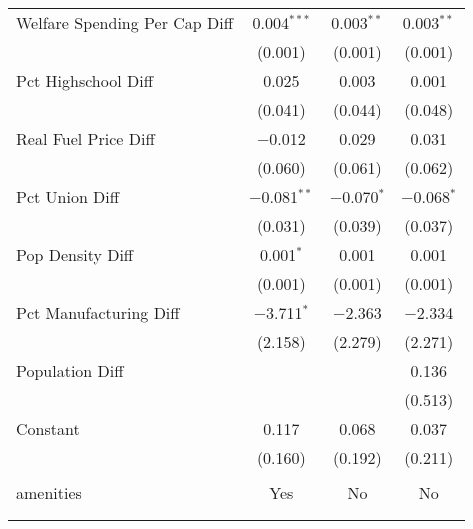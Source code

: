 \begin{table}[!htbp]
\begin{tabular}{@{\extracolsep{5pt}}lccc}
  Welfare Spending Per Cap Diff & 0.004$^{***}$ & 0.003$^{**}$ & 0.003$^{**}$ \\ 
  & (0.001) & (0.001) & (0.001) \\ 
  Pct Highschool Diff & 0.025 & 0.003 & 0.001 \\ 
  & (0.041) & (0.044) & (0.048) \\ 
  Real Fuel Price Diff & $-$0.012 & 0.029 & 0.031 \\ 
  & (0.060) & (0.061) & (0.062) \\ 
  Pct Union Diff & $-$0.081$^{**}$ & $-$0.070$^{*}$ & $-$0.068$^{*}$ \\ 
  & (0.031) & (0.039) & (0.037) \\ 
  Pop Density Diff & 0.001$^{*}$ & 0.001 & 0.001 \\ 
  & (0.001) & (0.001) & (0.001) \\ 
  Pct Manufacturing Diff & $-$3.711$^{*}$ & $-$2.363 & $-$2.334 \\ 
  & (2.158) & (2.279) & (2.271) \\ 
  Population Diff &  &  & 0.136 \\ 
  &  &  & (0.513) \\ 
  Constant & 0.117 & 0.068 & 0.037 \\ 
  & (0.160) & (0.192) & (0.211) \\ 
 \hline \\[-1.8ex] 
amenities & Yes & No & No \\ 
\hline \\[-1.8ex] 
\hline 
\hline \\[-1.8ex] 
\end{tabular} 
\end{table} 
